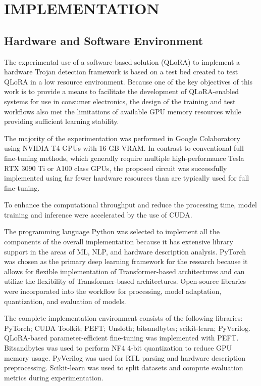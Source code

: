 \documentclass[12pt,a4paper]{report}
\begin{document}
\chapter{IMPLEMENTATION}

\section{Hardware and Software Environment}

The experimental use of a software-based solution (QLoRA) to implement a hardware Trojan detection framework is based on a test bed created to test QLoRA in a low resource environment. Because one of the key objectives of this work is to provide a means to facilitate the development of QLoRA-enabled systems for use in consumer electronics, the design of the training and test workflows also met the limitations of available GPU memory resources while providing sufficient learning stability.

The majority of the experimentation was performed in Google Colaboratory using NVIDIA T4 GPUs with 16 GB VRAM. In contrast to conventional full fine-tuning methods, which generally require multiple high-performance Tesla RTX 3090 Ti or A100 class GPUs, the proposed circuit was successfully implemented using far fewer hardware resources than are typically used for full fine-tuning.

To enhance the computational throughput and reduce the processing time, model training and inference were accelerated by the use of CUDA.

The programming language Python was selected to implement all the components of the overall implementation because it has extensive library support in the areas of ML, NLP, and hardware description analysis. PyTorch was chosen as the primary deep learning framework for the research because it allows for flexible implementation of Transformer-based architectures and can utilize the flexibility of Transformer-based architectures. Open-source libraries were incorporated into the workflow for processing, model adaptation, quantization, and evaluation of models.

The complete implementation environment consists of the following libraries: PyTorch; CUDA Toolkit; PEFT; Unsloth; bitsandbytes; scikit-learn; PyVerilog. QLoRA-based parameter-efficient fine-tuning was implemented with PEFT. Bitsandbytes was used to perform NF4 4-bit quantization to reduce GPU memory usage. PyVerilog was used for RTL parsing and hardware description preprocessing. Scikit-learn was used to split datasets and compute evaluation metrics during experimentation.
\end{document}
